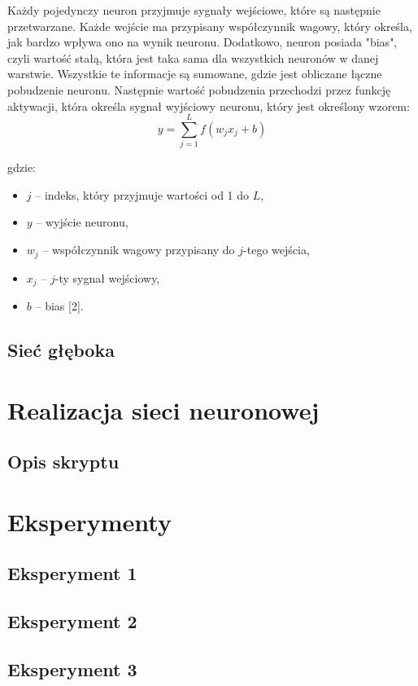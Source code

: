 \documentclass{article}
\begin{document}
Każdy pojedynczy neuron przyjmuje sygnały wejściowe, które są następnie przetwarzane.
Każde wejście ma przypisany współczynnik wagowy, który określa, jak bardzo wpływa ono na wynik neuronu.
Dodatkowo, neuron posiada "bias", czyli wartość stałą, która jest taka sama dla wszystkich neuronów w danej warstwie.
Wszystkie te informacje są sumowane, gdzie jest obliczane łączne pobudzenie neuronu.
Następnie wartość pobudzenia przechodzi przez funkcję aktywacji, która określa sygnał wyjściowy neuronu, który jest określony wzorem:
\[
    y = \sum_{j=1}^{L} f(w_{j} x_{j} + b)
\]

gdzie:
\begin{itemize}
    \item $j$ -- indeks, który przyjmuje wartości od 1 do $L$,
    \item $y$ -- wyjście neuronu,
    \item $w_{j}$ -- współczynnik wagowy przypisany do $j$-tego wejścia,
    \item $x_{j}$ -- $j$-ty sygnał wejściowy,
    \item $b$ -- bias [2].
\end{itemize}

\subsection{Sieć głęboka}
\section{Realizacja sieci neuronowej}
\subsection{Opis skryptu}
\section{Eksperymenty}
\subsection{Eksperyment 1}
\subsection{Eksperyment 2}
\subsection{Eksperyment 3}
\end{document}
